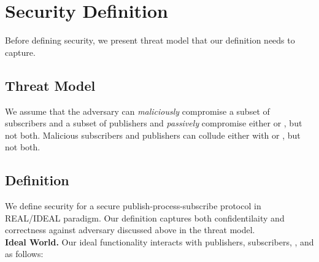 \section{Security Definition}
\label{sec:definition}

Before defining security, we present threat model that our definition needs to
capture.


\vspace{-10pt}
\subsection{Threat Model} We assume that the adversary can \emph{maliciously}
compromise a subset of subscribers and a subset of publishers and
\emph{passively} compromise either \broker or \garbler, but not both.
Malicious subscribers and publishers can collude either with \garbler or
\broker, but not both.

\vspace{-10pt}
\subsection{Definition}

We define security for a secure publish-process-subscribe protocol in
REAL/IDEAL paradigm. Our definition captures both confidentilaity and
correctness against adversary discussed above in the threat model.\\[6pt]
\noindent\textbf{Ideal World.}
Our ideal functionality \F interacts with publishers, subscribers, \broker, and
\garbler as follows:


